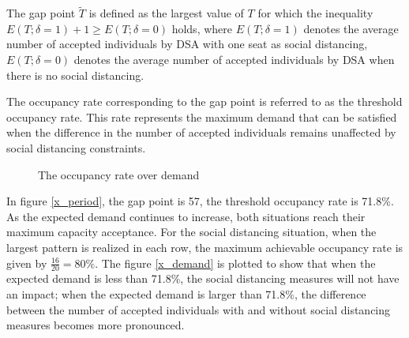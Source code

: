 


The gap point $\tilde{T}$ is defined as the largest value of $T$ for which the inequality $E(T; \delta =1)+1 \geq E(T; \delta = 0)$ holds, where $E(T; \delta =1)$ denotes the average number of accepted individuals by DSA with one seat as social distancing, $E(T; \delta = 0)$ denotes the average number of accepted individuals by DSA when there is no social distancing.

The occupancy rate corresponding to the gap point is referred to as the threshold occupancy rate. This rate represents the maximum demand that can be satisfied when the difference in the number of accepted individuals remains unaffected by social distancing constraints.

\begin{figure}[h]
  \centering
  \caption{The occupancy rate over demand}
  \label{occupancy_rate_demand}
\end{figure}

In figure \ref{x_period}, the gap point is 57, the threshold occupancy rate is 71.8\%. As the expected demand continues to increase, both situations reach their maximum capacity acceptance. For the social distancing situation, when the largest pattern is realized in each row, the maximum achievable occupancy rate is given by $\frac{16}{20} = 80\%$. The figure \ref{x_demand} is plotted to show that when the expected demand is less than 71.8\%, the social distancing measures will not have an impact; when the expected demand is larger than 71.8\%, the difference between the number of accepted individuals with and without social distancing measures becomes more pronounced.

